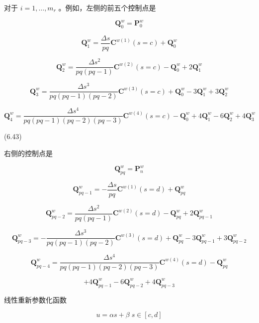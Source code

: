 \documentclass[../main.tex]{subfiles}
\begin{document}
对于 \(i = 1,\ldots ,{m}_{r}\) 。例如，左侧的前五个控制点是

\[
{\mathbf{Q}}_{0}^{w} = {\mathbf{P}}_{0}^{w}
\]

\[
{\mathbf{Q}}_{1}^{w} = \frac{\Delta s}{pq}{\mathbf{C}}^{w\left( 1\right) }\left( {s = c}\right)  + {\mathbf{Q}}_{0}^{w}
\]

\[
{\mathbf{Q}}_{2}^{w} = \frac{\Delta {s}^{2}}{{pq}\left( {{pq} - 1}\right) }{\mathbf{C}}^{w\left( 2\right) }\left( {s = c}\right)  - {\mathbf{Q}}_{0}^{w} + 2{\mathbf{Q}}_{1}^{w}
\]

\[
{\mathbf{Q}}_{3}^{w} = \frac{\Delta {s}^{3}}{{pq}\left( {{pq} - 1}\right) \left( {{pq} - 2}\right) }{\mathbf{C}}^{w\left( 3\right) }\left( {s = c}\right)  + {\mathbf{Q}}_{0}^{w} - 3{\mathbf{Q}}_{1}^{w} + 3{\mathbf{Q}}_{2}^{w}
\]

\[
{\mathbf{Q}}_{4}^{w} = \frac{\Delta {s}^{4}}{{pq}\left( {{pq} - 1}\right) \left( {{pq} - 2}\right) \left( {{pq} - 3}\right) }{\mathbf{C}}^{w\left( 4\right) }\left( {s = c}\right)  - {\mathbf{Q}}_{0}^{w} + 4{\mathbf{Q}}_{1}^{w} - 6{\mathbf{Q}}_{2}^{w} + 4{\mathbf{Q}}_{3}^{w}
\]

(6.43)

右侧的控制点是

\[
{\mathbf{Q}}_{pq}^{w} = {\mathbf{P}}_{n}^{w}
\]

\[
{\mathbf{Q}}_{{pq} - 1}^{w} =  - \frac{\Delta s}{pq}{\mathbf{C}}^{w\left( 1\right) }\left( {s = d}\right)  + {\mathbf{Q}}_{pq}^{w}
\]

\[
{\mathbf{Q}}_{{pq} - 2}^{w} = \frac{\Delta {s}^{2}}{{pq}\left( {{pq} - 1}\right) }{\mathbf{C}}^{w\left( 2\right) }\left( {s = d}\right)  - {\mathbf{Q}}_{pq}^{w} + 2{\mathbf{Q}}_{{pq} - 1}^{w}
\]

\[
{\mathbf{Q}}_{{pq} - 3}^{w} =  - \frac{\Delta {s}^{3}}{{pq}\left( {{pq} - 1}\right) \left( {{pq} - 2}\right) }{\mathbf{C}}^{w\left( 3\right) }\left( {s = d}\right)  + {\mathbf{Q}}_{pq}^{w} - 3{\mathbf{Q}}_{{pq} - 1}^{w} + 3{\mathbf{Q}}_{{pq} - 2}^{w}
\]

\[
{\mathbf{Q}}_{{pq} - 4}^{w} = \frac{\Delta {s}^{4}}{{pq}\left( {{pq} - 1}\right) \left( {{pq} - 2}\right) \left( {{pq} - 3}\right) }{\mathbf{C}}^{w\left( 4\right) }\left( {s = d}\right)  - {\mathbf{Q}}_{pq}^{w}
\]

\[
+ 4{\mathbf{Q}}_{{pq} - 1}^{w} - 6{\mathbf{Q}}_{{pq} - 2}^{w} + 4{\mathbf{Q}}_{{pq} - 3}^{w} \tag{6.44}
\]

线性重新参数化函数

\[
u = {\alpha s} + \beta \;s \in  \left\lbrack  {c,d}\right\rbrack   \tag{6.45}
\]
\end{document}
